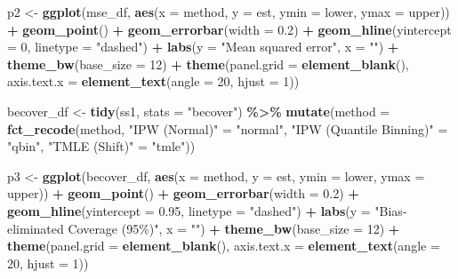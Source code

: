 \documentclass[
]{article}
\newenvironment{Shaded}{\begin{snugshade}}{\end{snugshade}}
\newcommand{\AttributeTok}[1]{\textcolor[rgb]{0.13,0.29,0.53}{#1}}
\newcommand{\DecValTok}[1]{\textcolor[rgb]{0.00,0.00,0.81}{#1}}
\newcommand{\FloatTok}[1]{\textcolor[rgb]{0.00,0.00,0.81}{#1}}
\newcommand{\FunctionTok}[1]{\textcolor[rgb]{0.13,0.29,0.53}{\textbf{#1}}}
\newcommand{\NormalTok}[1]{#1}
\newcommand{\OtherTok}[1]{\textcolor[rgb]{0.56,0.35,0.01}{#1}}
\newcommand{\SpecialCharTok}[1]{\textcolor[rgb]{0.81,0.36,0.00}{\textbf{#1}}}
\newcommand{\StringTok}[1]{\textcolor[rgb]{0.31,0.60,0.02}{#1}}
\begin{document}
\begin{Shaded}
\begin{Highlighting}[]
\NormalTok{p2 }\OtherTok{\textless{}{-}} \FunctionTok{ggplot}\NormalTok{(mse\_df, }\FunctionTok{aes}\NormalTok{(}\AttributeTok{x =}\NormalTok{ method, }\AttributeTok{y =}\NormalTok{ est, }\AttributeTok{ymin =}\NormalTok{ lower, }\AttributeTok{ymax =}\NormalTok{ upper)) }\SpecialCharTok{+}
  \FunctionTok{geom\_point}\NormalTok{() }\SpecialCharTok{+}
  \FunctionTok{geom\_errorbar}\NormalTok{(}\AttributeTok{width =} \FloatTok{0.2}\NormalTok{) }\SpecialCharTok{+}
  \FunctionTok{geom\_hline}\NormalTok{(}\AttributeTok{yintercept =} \DecValTok{0}\NormalTok{, }\AttributeTok{linetype =} \StringTok{"dashed"}\NormalTok{) }\SpecialCharTok{+}
  \FunctionTok{labs}\NormalTok{(}\AttributeTok{y =} \StringTok{"Mean squared error"}\NormalTok{, }\AttributeTok{x =} \StringTok{""}\NormalTok{) }\SpecialCharTok{+}
  \FunctionTok{theme\_bw}\NormalTok{(}\AttributeTok{base\_size =} \DecValTok{12}\NormalTok{) }\SpecialCharTok{+}
  \FunctionTok{theme}\NormalTok{(}\AttributeTok{panel.grid =} \FunctionTok{element\_blank}\NormalTok{(),}
        \AttributeTok{axis.text.x =} \FunctionTok{element\_text}\NormalTok{(}\AttributeTok{angle =} \DecValTok{20}\NormalTok{, }\AttributeTok{hjust =} \DecValTok{1}\NormalTok{))}

\NormalTok{becover\_df }\OtherTok{\textless{}{-}} \FunctionTok{tidy}\NormalTok{(ss1, }\AttributeTok{stats =} \StringTok{"becover"}\NormalTok{) }\SpecialCharTok{\%\textgreater{}\%}
  \FunctionTok{mutate}\NormalTok{(}\AttributeTok{method =} \FunctionTok{fct\_recode}\NormalTok{(method,}
                             \StringTok{"IPW (Normal)"} \OtherTok{=} \StringTok{"normal"}\NormalTok{,}
                             \StringTok{"IPW (Quantile Binning)"} \OtherTok{=} \StringTok{"qbin"}\NormalTok{,}
                             \StringTok{"TMLE (Shift)"} \OtherTok{=} \StringTok{"tmle"}\NormalTok{))}

\NormalTok{p3 }\OtherTok{\textless{}{-}} \FunctionTok{ggplot}\NormalTok{(becover\_df, }\FunctionTok{aes}\NormalTok{(}\AttributeTok{x =}\NormalTok{ method, }\AttributeTok{y =}\NormalTok{ est, }\AttributeTok{ymin =}\NormalTok{ lower, }\AttributeTok{ymax =}\NormalTok{ upper)) }\SpecialCharTok{+}
  \FunctionTok{geom\_point}\NormalTok{() }\SpecialCharTok{+}
  \FunctionTok{geom\_errorbar}\NormalTok{(}\AttributeTok{width =} \FloatTok{0.2}\NormalTok{) }\SpecialCharTok{+}
  \FunctionTok{geom\_hline}\NormalTok{(}\AttributeTok{yintercept =} \FloatTok{0.95}\NormalTok{, }\AttributeTok{linetype =} \StringTok{"dashed"}\NormalTok{) }\SpecialCharTok{+}
  \FunctionTok{labs}\NormalTok{(}\AttributeTok{y =} \StringTok{"Bias{-}eliminated Coverage (95\%)"}\NormalTok{, }\AttributeTok{x =} \StringTok{""}\NormalTok{) }\SpecialCharTok{+}
  \FunctionTok{theme\_bw}\NormalTok{(}\AttributeTok{base\_size =} \DecValTok{12}\NormalTok{) }\SpecialCharTok{+}
  \FunctionTok{theme}\NormalTok{(}\AttributeTok{panel.grid =} \FunctionTok{element\_blank}\NormalTok{(),}
        \AttributeTok{axis.text.x =} \FunctionTok{element\_text}\NormalTok{(}\AttributeTok{angle =} \DecValTok{20}\NormalTok{, }\AttributeTok{hjust =} \DecValTok{1}\NormalTok{))}


\end{Highlighting}
\end{Shaded}
\end{document}
